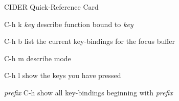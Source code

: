 \documentclass[a4paper,10pt]{article}
\newcommand\meta[1]{\textlangle\textit{#1}\textrangle}
\newcommand\keyify[1]{\keys{\ttfamily#1}}
\begin{document}
\begin{center}
  \Huge
  CIDER Quick-Reference Card
  \par\bigskip
\end{center}

\begin{center}
  \begin{tcolorbox}[title=Getting Help in Emacs, center title, fonttitle=\Large\bfseries]
      \begin{keylist}[labelindent=4ex,before=,labelwidth=\widthof{\keyify{\meta{prefix}
            C-h}}]
      \item[C-h k \meta{key}] describe function bound to \meta{key}
      \item[C-h b] list the current key-bindings for the focus buffer
      \item[C-h m] describe mode
      \item[C-h l] show the keys you have pressed
      \item[\meta{prefix} C-h] show all key-bindings beginning with
        \meta{prefix}
      \end{keylist}
  \end{tcolorbox}
\end{center}
\bigskip

\setlength{\columnsep}{1cm}
\end{document}
